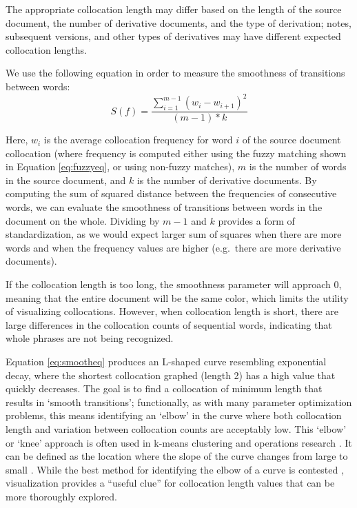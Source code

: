 The appropriate collocation length may differ based on the length of the source document, the number of derivative documents, and the type of derivation; notes, subsequent versions, and other types of derivatives may have different expected collocation lengths.

We use the following equation in order to measure the smoothness of transitions between words:
\begin{equation}
S(f)=\frac{\sum_{i=1}^{m-1}(w_i-w_{i+1})^2}{(m-1)*k}
\label{eq:smootheq}
  \end{equation}

Here, \(w_i\) is the average collocation frequency for word \(i\) of the source document collocation (where frequency is computed either using the fuzzy matching shown in Equation \eqref{eq:fuzzyeq}, or using non-fuzzy matches), \(m\) is the number of words in the source document, and \(k\) is the number of derivative documents.
By computing the sum of squared distance between the frequencies of consecutive words, we can evaluate the smoothness of transitions between words in the document on the whole.
Dividing by \(m-1\) and \(k\) provides a form of standardization, as we would expect larger sum of squares when there are more words and when the frequency values are higher (e.g.~there are more derivative documents).

If the collocation length is too long, the smoothness parameter will approach 0, meaning that the entire document will be the same color, which limits the utility of visualizing collocations.
However, when collocation length is short, there are large differences in the collocation counts of sequential words, indicating that whole phrases are not being recognized.

Equation \eqref{eq:smootheq} produces an L-shaped curve resembling exponential decay, where the shortest collocation graphed (length 2) has a high value that quickly decreases.
The goal is to find a collocation of minimum length that results in `smooth transitions'; functionally, as with many parameter optimization problems, this means identifying an `elbow' in the curve where both collocation length and variation between collocation counts are acceptably low.
This `elbow' or `knee' approach is often used in k-means clustering \citep{schubert_stop_2023} and operations research \citep{thomas_knee_1999}.
It can be defined as the location where the slope of the curve changes from large to small \citep{thomas_knee_1999}.
While the best method for identifying the elbow of a curve is contested \citep{schubert_stop_2023}, visualization provides a ``useful clue'' \citep{thomas_knee_1999} for collocation length values that can be more thoroughly explored.

